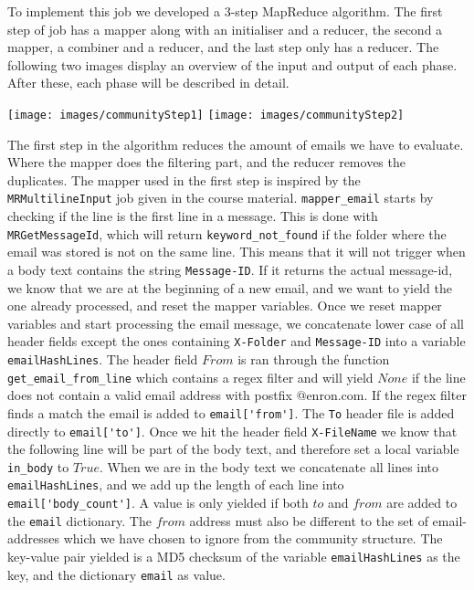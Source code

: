 \documentclass[runningheads,a4paper]{llncs}
\begin{document}
\newline
\newline
To implement this job we developed a 3-step MapReduce algorithm. The first step of job has a mapper along with an initialiser and a reducer, the second a mapper, a combiner and a reducer, and the last step only has a reducer. The following two images display an overview of the input and output of each phase. After these, each phase will be described in detail.
\begin{center}
		\texttt{[image: images/communityStep1]}
		\texttt{[image: images/communityStep2]}
	\end{center}

The first step in the algorithm reduces the amount of emails we have to evaluate. Where the mapper does the filtering part, and the reducer removes the duplicates.
The mapper used in the first step is inspired by the \verb!MRMultilineInput! job given in the course material.
\verb!mapper_email! starts by checking if the line is the first line in a message. This is done with \verb!MRGetMessageId!, which will return \verb!keyword_not_found! if the folder where the email was stored is not on the same line. This means that it will not trigger when a body text contains the string \verb!Message-ID!. If it returns the actual message-id, we know that we are at the beginning of a new email, and we want to yield the one already processed, and reset the mapper variables.
Once we reset mapper variables and start processing the email message, we concatenate lower case of all header fields except the ones containing \verb!X-Folder! and \verb!Message-ID! into a variable \verb!emailHashLines!. The header field $From$ is ran through the function \verb!get_email_from_line! which contains a regex filter and will yield $None$ if the line does not contain a valid email address with postfix @enron.com. If the regex filter finds a match the email is added to \verb!email['from']!. The \verb!To! header file is added directly to \verb!email['to']!.
\newline
\newline
Once we hit the header field \verb!X-FileName! we know that the following line will be part of the body text, and therefore set a local variable \verb!in_body! to $True$.
When we are in the body text we concatenate all lines into \verb!emailHashLines!, and we add up the length of each line into \verb!email['body_count']!. 
\newline
\newline
A value is only yielded if both $to$ and $from$ are added to the \verb!email! dictionary. The $from$ address must also be different to the set of email-addresses which we have chosen to ignore from the community structure.
The key-value pair yielded is a MD5 checksum of the variable \verb!emailHashLines! as the key, and the dictionary \verb!email! as value.
\end{document}
